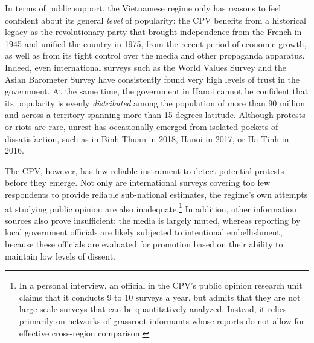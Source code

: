 \documentclass[12pt]{article}
\newcommand\fnote[1]{\footnote{\baselineskip=2\normalbaselineskip#1}}
\newcommand{\1}{\mathbbm{1}}
\begin{document}
In terms of public support, the Vietnamese regime only has reasons to feel confident about its general \textit{level} of popularity: the CPV benefits from a historical legacy as the revolutionary party that brought independence from the French in 1945 and unified the country in 1975, from the recent period of economic growth, as well as from its tight control over the media and other propaganda apparatus. Indeed, even international surveys such as the World Values Survey \citeyearpar{wvs} and the Asian Barometer Survey have consistently found very high levels of trust in the government. At the same time, the government in Hanoi cannot be confident that its popularity is evenly \textit{distributed} among the population of more than 90 million and across a territory spanning more than 15 degrees latitude. Although protests or riots are rare, unrest has occasionally emerged from isolated pockets of dissatisfaction, such as in Binh Thuan in 2018, Hanoi in 2017, or Ha Tinh in 2016. 

The CPV, however, has few reliable instrument to detect potential protests before they emerge. Not only are international surveys covering too few respondents to provide reliable sub-national estimates, the regime's own attempts at studying public opinion are also inadequate.\fnote{In a personal interview, an official in the CPV's public opinion research unit claims that it conducts 9 to 10 surveys a year, but admits that they are not large-scale surveys that can be quantitatively analyzed. Instead, it relies primarily on networks of grassroot informants whose reports do not allow for effective cross-region comparison.} %
In addition, other information sources also prove insufficient: the media is largely muted, whereas reporting by local government officials are likely subjected to intentional embellishment, because these officials are evaluated for promotion based on their ability to maintain low levels of dissent.
\end{document}
